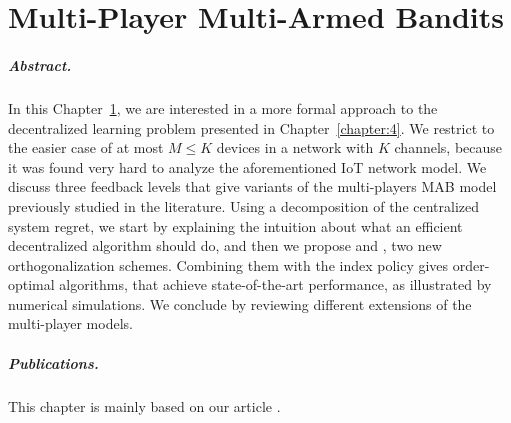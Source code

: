 
\chapter{Multi-Player Multi-Armed Bandits}
\label{chapter:5}


\paragraph{Abstract.}
%
In this Chapter~\ref{chapter:5}, we are interested in a more formal approach to the decentralized learning problem presented in Chapter~\ref{chapter:4}.
We restrict to the easier case of at most $M \leq K$ devices in a network with $K$ channels, because it was found very hard to analyze the aforementioned IoT network model.
%
We discuss three feedback levels that give variants of the multi-players MAB model previously studied in the literature.
Using a decomposition of the centralized system regret, we start by explaining the intuition about what an efficient decentralized algorithm should do, and then we propose \RandTopM{} and \MCTopM, two new orthogonalization schemes.
Combining them with the \klUCB{} index policy gives order-optimal algorithms, that achieve state-of-the-art performance,
as illustrated by numerical simulations.
We conclude by reviewing different extensions of the multi-player models.

\minitoc

\vfill{}

\paragraph{Publications.}

This chapter is mainly based on our article \cite{Besson2018ALT}.


\newpage
\graphicspath{{2-Chapters/5-Chapter/Images/}}
\graphicspath{{2-Chapters/5-Chapter/ALT_2018__MPBandits.git/figures/}}




\newpage  %

